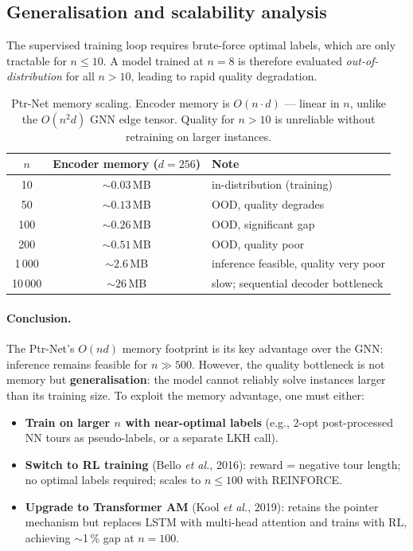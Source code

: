 \documentclass[12pt,a4paper]{article}
\begin{document}
\subsection{Generalisation and scalability analysis}
\label{sec:scalability}

The supervised training loop requires brute-force optimal labels, which are
only tractable for $n \leq 10$.
A model trained at $n = 8$ is therefore evaluated \emph{out-of-distribution}
for all $n > 10$, leading to rapid quality degradation.

\begin{table}[H]
\centering
{}
\begin{tabularx}{\linewidth}{ccX}
\toprule
$n$ & Encoder memory ($d=256$) & Note \\
\midrule
10      & ${\sim}0.03$\,MB  & in-distribution (training) \\
50      & ${\sim}0.13$\,MB  & OOD, quality degrades \\
100     & ${\sim}0.26$\,MB  & OOD, significant gap \\
200     & ${\sim}0.51$\,MB  & OOD, quality poor \\
1\,000  & ${\sim}2.6$\,MB   & inference feasible, quality very poor \\
10\,000 & ${\sim}26$\,MB    & slow; sequential decoder bottleneck \\
\bottomrule
\end{tabularx}
\caption{Ptr-Net memory scaling.
  Encoder memory is $O(n \cdot d)$ --- linear in $n$, unlike the $O(n^2 d)$
  GNN edge tensor.
  Quality for $n > 10$ is unreliable without retraining on larger instances.}
\label{tab:scalability}
\end{table}

\paragraph{Conclusion.}
The Ptr-Net's $O(n d)$ memory footprint is its key advantage over the GNN:
inference remains feasible for $n \gg 500$.
However, the quality bottleneck is not memory but \textbf{generalisation}:
the model cannot reliably solve instances larger than its training size.
To exploit the memory advantage, one must either:

\begin{itemize}[leftmargin=1.5em]
  \item \textbf{Train on larger $n$ with near-optimal labels} (e.g., 2-opt
    post-processed NN tours as pseudo-labels, or a separate LKH call).
  \item \textbf{Switch to RL training} (Bello \textit{et al.}, 2016):
    reward = negative tour length; no optimal labels required; scales to
    $n \leq 100$ with REINFORCE.
  \item \textbf{Upgrade to Transformer AM} (Kool \textit{et al.}, 2019):
    retains the pointer mechanism but replaces LSTM with multi-head attention
    and trains with RL, achieving $\sim$1\,\% gap at $n = 100$.
\end{itemize}
\end{document}
